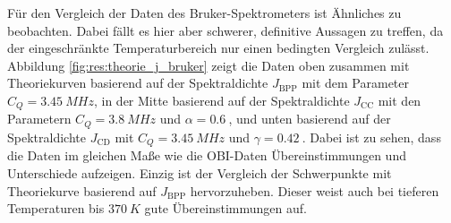 Für den Vergleich der Daten des Bruker-Spektrometers ist Ähnliches zu beobachten. Dabei fällt es hier aber schwerer, definitive Aussagen zu treffen, da der eingeschränkte Temperaturbereich nur einen bedingten Vergleich zulässt. Abbildung \ref{fig:res:theorie_j_bruker} zeigt die Daten oben zusammen mit Theoriekurven basierend auf der Spektraldichte $J_\text{BPP}$ mit dem Parameter $C_Q = \SI{3.45}{MHz}$, in der Mitte basierend auf der Spektraldichte $J_\text{CC}$ mit den Parametern $C_Q = \SI{3.8}{MHz}$ und $\alpha = \SI{0.6}{}$, und unten basierend auf der Spektraldichte $J_\text{CD}$ mit $C_Q = \SI{3.45}{MHz}$ und $\gamma = \SI{0.42}{}$. Dabei ist zu sehen, dass die Daten im gleichen Maße wie die OBI-Daten Übereinstimmungen und Unterschiede aufzeigen. Einzig ist der Vergleich der Schwerpunkte mit Theoriekurve basierend auf $J_\text{BPP}$ hervorzuheben. Dieser weist auch bei tieferen Temperaturen bis $\SI{370}{K}$ gute Übereinstimmungen auf.
